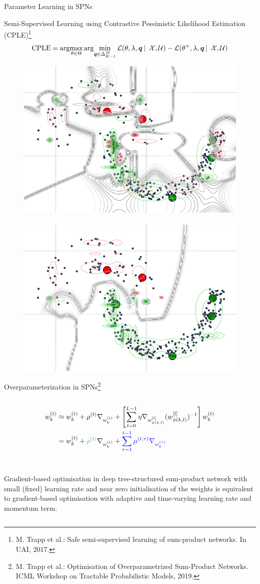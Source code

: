 \begin{frame}{Parameter Learning in SPNs}{}
\begin{block}{Semi-Supervised Learning using Contrastive Pessimistic Likelihood Estimation (CPLE)\footnote{\scriptsize M. Trapp et al.: Safe semi-supervised learning of sum-product networks. In UAI, 2017.}}
\begin{equation}
  \text{CPLE} = \argmax_{\theta \in \Theta} \argmin_{\bm q \in \Delta_{K-1}^M} \mathcal{L}(\theta,  \lambda, \bm{q} \,| \, \mathcal{X}, \mathcal{U}) - \mathcal{L}(\theta^+, \lambda, \bm{q} \,| \, \mathcal{X}, \mathcal{U})
\end{equation}
\end{block}

\begin{figure}
  \includegraphics[width=.4\textwidth]{semisupervised_2_2}~
   \includegraphics[width=.4\textwidth]{semisupervised_20_2}
\end{figure}

\end{frame}

\begin{frame}{Overparameterization in SPNs\footnote{\scriptsize M. Trapp et al.: Optimisation of Overparametrized Sum-Product Networks. ICML Workshop on Tractable Probabilistic Models, 2019.}}{}
\begin{columns}
\begin{column}{\linewidth}
\begin{align}
    w^{(t)}_{k} &\approx w^{(t)}_{k} + \rho^{(t)} \nabla_{w^{(t)}_{k}} + \left[ \sum_{l=0}^{L-1} \eta \nabla_{w^{[l]}_{\phi(k, l)}} (w^{[l]}_{\phi(k, l)})^{-1} \right] w^{(t)}_{k} \\
  &= w^{(t)}_{k} + {\color{cyan} \rho^{(t)}} \nabla_{w^{(t)}_{k}} + {\color{blue}\sum_{\tau=1}^{t-1} \mu^{(t,\tau)} \nabla_{w^{(\tau)}_k}}
\end{align}\\
  \begin{tcolorbox}[lower separated=false]
  \small{Gradient-based optimisation in deep tree-structured sum-product network with small (fixed) learning rate and near zero initialisation of the weights is equivalent to gradient-based optimisation with adaptive and time-varying {\color{cyan} learning rate} and {\color{blue} momentum term}.}
 \end{tcolorbox}
\end{column}
\end{columns}
\end{frame}

